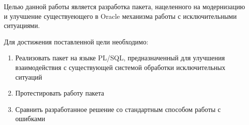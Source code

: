 
Целью данной работы является разработка пакета, нацеленного на модернизацию и улучшение существуеющего в Oracle механизма работы с исключительными ситуациями.

Для достижения поставленной цели необходимо:
\begin{enumerate}
	\item Реализовать пакет на языке PL/SQL, предназначенный для улучшения взаимодействия с существующей системой обработки исключительных ситуаций
	\item Протестировать работу пакета
	\item Сравнить разработанное решение со стандартным способом работы с ошибками
\end{enumerate} 


\newpage %
